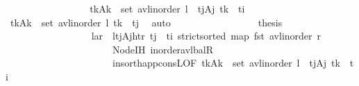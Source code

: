 \begin{isabellebody}
\ \ \ \ \ \ \ \ \ \ \ \ \ \ \isamarkupfalse%
\ \isamarkupfalse%
\ {\isachardoublequoteopen}{\isasymforall}{\isacharparenleft}{\kern0pt}t\isactrlsub k{\isacharcomma}{\kern0pt}A\isactrlsub k{\isacharparenright}{\kern0pt}\ {\isasymin}\ set\ {\isacharparenleft}{\kern0pt}avl{\isacharunderscore}{\kern0pt}inorder\ l\ {\isacharat}{\kern0pt}\ {\isacharbrackleft}{\kern0pt}{\isacharparenleft}{\kern0pt}t\isactrlsub j{\isacharcomma}{\kern0pt}A\isactrlsub j{\isacharparenright}{\kern0pt}{\isacharbrackright}{\kern0pt}{\isacharparenright}{\kern0pt}{\isachardot}{\kern0pt}\ t\isactrlsub k\ {\isacharless}{\kern0pt}\ t\isactrlsub i{\isachardoublequoteclose}\isanewline
\ \ \ \ \ \ \ \ \ \ \ \ \ \ \ \ \isamarkupfalse%
\ {\isacartoucheopen}{\isasymforall}{\isacharparenleft}{\kern0pt}t\isactrlsub k{\isacharcomma}{\kern0pt}A\isactrlsub k{\isacharparenright}{\kern0pt}\ {\isasymin}\ set\ {\isacharparenleft}{\kern0pt}avl{\isacharunderscore}{\kern0pt}inorder\ l{\isacharparenright}{\kern0pt}{\isachardot}{\kern0pt}\ t\isactrlsub k\ {\isacharless}{\kern0pt}\ t\isactrlsub j{\isacartoucheclose}\ \isamarkupfalse%
\ auto\isanewline
\ \ \ \ \ \ \ \ \ \ \ \ \ \ \isamarkupfalse%
\ \isamarkupfalse%
\ {\isacharquery}{\kern0pt}thesis\isanewline
\ \ \ \ \ \ \ \ \ \ \ \ \ \ \ \ \isamarkupfalse%
\ {\isacartoucheopen}{\isasymlangle}l{\isacharcomma}{\kern0pt}a{\isacharcomma}{\kern0pt}r{\isasymrangle}\ {\isacharequal}{\kern0pt}\ {\isasymlangle}l{\isacharcomma}{\kern0pt}{\isacharparenleft}{\kern0pt}{\isacharparenleft}{\kern0pt}t\isactrlsub j{\isacharcomma}{\kern0pt}A\isactrlsub j{\isacharparenright}{\kern0pt}{\isacharcomma}{\kern0pt}ht{\isacharparenright}{\kern0pt}{\isacharcomma}{\kern0pt}r{\isasymrangle}{\isacartoucheclose}\ {\isacartoucheopen}t\isactrlsub j\ {\isacharless}{\kern0pt}\ t\isactrlsub i{\isacartoucheclose}\ {\isacartoucheopen}strict{\isacharunderscore}{\kern0pt}sorted\ {\isacharparenleft}{\kern0pt}map\ fst\ {\isacharparenleft}{\kern0pt}avl{\isacharunderscore}{\kern0pt}inorder\ r{\isacharparenright}{\kern0pt}{\isacharparenright}{\kern0pt}{\isacartoucheclose}\ \isanewline
\ \ \ \ \ \ \ \ \ \ \ \ \ \ \ \ \ \ \ \ \ \ Node{\isachardot}{\kern0pt}IH\ inorder{\isacharunderscore}{\kern0pt}avl{\isacharunderscore}{\kern0pt}balR\ \isanewline
\ \ \ \ \ \ \ \ \ \ \ \ \ \ \ \ \ \ \ \ \ \ insort{\isacharunderscore}{\kern0pt}happ{\isacharunderscore}{\kern0pt}consL{\isacharbrackleft}{\kern0pt}OF\ {\isacartoucheopen}{\isasymforall}{\isacharparenleft}{\kern0pt}t\isactrlsub k{\isacharcomma}{\kern0pt}A\isactrlsub k{\isacharparenright}{\kern0pt}\ {\isasymin}\ set\ {\isacharparenleft}{\kern0pt}avl{\isacharunderscore}{\kern0pt}inorder\ l\ {\isacharat}{\kern0pt}\ {\isacharbrackleft}{\kern0pt}{\isacharparenleft}{\kern0pt}t\isactrlsub j{\isacharcomma}{\kern0pt}A\isactrlsub j{\isacharparenright}{\kern0pt}{\isacharbrackright}{\kern0pt}{\isacharparenright}{\kern0pt}{\isachardot}{\kern0pt}\ t\isactrlsub k\ {\isacharless}{\kern0pt}\ t\isactrlsub i{\isacartoucheclose}{\isacharbrackright}{\kern0pt}\ \isanewline

\end{isabellebody}

